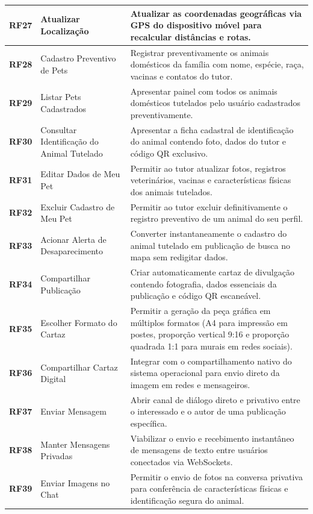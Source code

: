 {\begin{longtable}{|>{\centering\arraybackslash}p{1.3cm}|>{\raggedright\arraybackslash}p{4.2cm}|>{\raggedright\arraybackslash}p{8.8cm}|}
\textbf{RF27} & Atualizar Localização & Atualizar as coordenadas geográficas via GPS do dispositivo móvel para recalcular distâncias e rotas. \\ \hline
\textbf{RF28} & Cadastro Preventivo de Pets & Registrar preventivamente os animais domésticos da família com nome, espécie, raça, vacinas e contatos do tutor. \\ \hline
\textbf{RF29} & Listar Pets Cadastrados & Apresentar painel com todos os animais domésticos tutelados pelo usuário cadastrados preventivamente. \\ \hline
\textbf{RF30} & Consultar Identificação do Animal Tutelado & Apresentar a ficha cadastral de identificação do animal contendo foto, dados do tutor e código QR exclusivo. \\ \hline
\textbf{RF31} & Editar Dados de Meu Pet & Permitir ao tutor atualizar fotos, registros veterinários, vacinas e características físicas dos animais tutelados. \\ \hline
\textbf{RF32} & Excluir Cadastro de Meu Pet & Permitir ao tutor excluir definitivamente o registro preventivo de um animal do seu perfil. \\ \hline
\textbf{RF33} & Acionar Alerta de Desaparecimento & Converter instantaneamente o cadastro do animal tutelado em publicação de busca no mapa sem redigitar dados. \\ \hline
\textbf{RF34} & Compartilhar Publicação & Criar automaticamente cartaz de divulgação contendo fotografia, dados essenciais da publicação e código QR escaneável. \\ \hline
\textbf{RF35} & Escolher Formato do Cartaz & Permitir a geração da peça gráfica em múltiplos formatos (A4 para impressão em postes, proporção vertical 9:16 e proporção quadrada 1:1 para murais em redes sociais). \\ \hline
\textbf{RF36} & Compartilhar Cartaz Digital & Integrar com o compartilhamento nativo do sistema operacional para envio direto da imagem em redes e mensageiros. \\ \hline
\textbf{RF37} & Enviar Mensagem & Abrir canal de diálogo direto e privativo entre o interessado e o autor de uma publicação específica. \\ \hline
\textbf{RF38} & Manter Mensagens Privadas & Viabilizar o envio e recebimento instantâneo de mensagens de texto entre usuários conectados via WebSockets. \\ \hline
\textbf{RF39} & Enviar Imagens no Chat & Permitir o envio de fotos na conversa privativa para conferência de características físicas e identificação segura do animal. \\ \hline

\end{longtable}}
